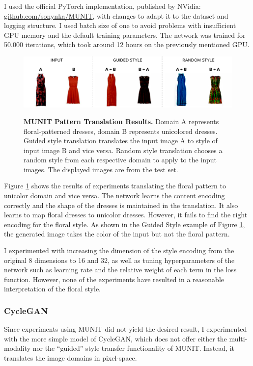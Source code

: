 \documentclass[12pt]{report}
\begin{document}
I used the official PyTorch implementation, published by NVidia: \linebreak\hyperlink{https://github.com/sonynka/MUNIT}{github.com/sonynka/MUNIT}, with changes to adapt it to the dataset and logging structure. I used batch size of one to avoid problems with insufficient GPU memory and the default training parameters. The network was trained for 50.000 iterations, which took around 12 hours on the previously mentioned GPU.

\begin{figure}[h]
\centering
{\includegraphics[width=\linewidth]{04_experiments/munit/munit_results}}
\caption{\label{fig:munit_results} \textbf{MUNIT Pattern Translation Results.} Domain A represents floral-patterned dresses, domain B represents unicolored dresses. Guided style translation translates the input image A to style of input image B and vice versa. Random style translation chooses a random style from each respective domain to apply to the input images. The displayed images are from the test set.}
\end{figure}

Figure \ref{fig:munit_results} shows the results of experiments translating the floral pattern to unicolor domain and vice versa. The network learns the content encoding correctly and the shape of the dresses is maintained in the translation. It also learns to map floral dresses to unicolor dresses. However, it fails to find the right encoding for the floral style. As shown in the Guided Style example of Figure \ref{fig:munit_results}, the generated image takes the color of the input but not the floral pattern.

I experimented with increasing the dimension of the style encoding from the original 8 dimensions to 16 and 32, as well as tuning hyperparameters of the network such as learning rate and the relative weight of each term in the loss function. However, none of the experiments have resulted in a reasonable interpretation of the floral style.

\subsubsection{CycleGAN}
Since experiments using MUNIT did not yield the desired result, I experimented with the more simple model of CycleGAN, which does not offer either the multi-modality nor the ``guided'' style transfer functionality of MUNIT. Instead, it translates the image domains in pixel-space.
\end{document}
